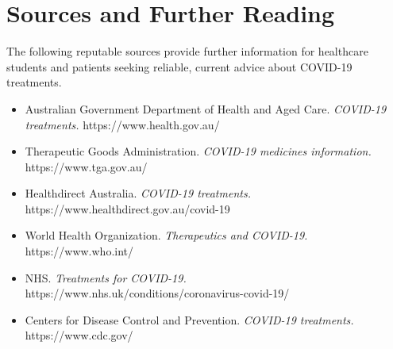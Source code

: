 \section*{Sources and Further Reading}
The following reputable sources provide further information for healthcare students and patients seeking reliable, current advice about COVID-19 treatments.

\begin{itemize}
    \item Australian Government Department of Health and Aged Care. \textit{COVID-19 treatments.} https://www.health.gov.au/
    \item Therapeutic Goods Administration. \textit{COVID-19 medicines information.} https://www.tga.gov.au/
    \item Healthdirect Australia. \textit{COVID-19 treatments.} https://www.healthdirect.gov.au/covid-19
    \item World Health Organization. \textit{Therapeutics and COVID-19.} https://www.who.int/
    \item NHS. \textit{Treatments for COVID-19.} https://www.nhs.uk/conditions/coronavirus-covid-19/
    \item Centers for Disease Control and Prevention. \textit{COVID-19 treatments.} https://www.cdc.gov/
\end{itemize}
